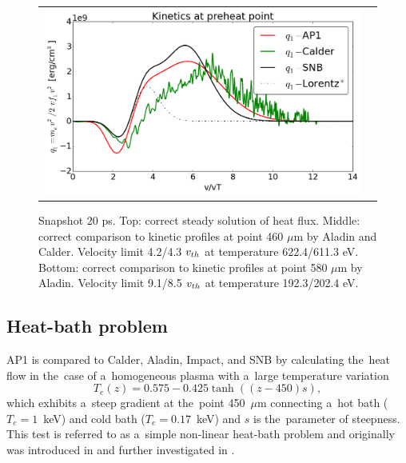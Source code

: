 \begin{figure}[htb]
\begin{center}
\begin{tabular}{cc}
      \includegraphics[width=\figscale\textwidth]{../VFPdata/C7_Calder_case5_nonlocal_kinetics.png}
	\end{tabular}
  \caption{  
  Snapshot 20 ps. Top: correct steady solution of heat flux. 
  Middle: correct comparison to kinetic profiles at point 460 $\mu$m 
  by Aladin and Calder. 
  Velocity limit 4.2/4.3 $v_{th}$ at temperature 622.4/611.3 eV.
  Bottom: correct comparison to kinetic profiles at point 580 $\mu$m by Aladin.
  Velocity limit 9.1/8.5 $v_{th}$ at temperature 192.3/202.4 eV.
  }
  \label{fig:C7_AladinCalder_case5}
  \end{center} 
\end{figure}

\subsection{Heat-bath problem}  
\label{sec:heatbath_test}

AP1 is compared to Calder, Aladin, Impact, and SNB by 
calculating the~heat flow in the~case of a~homogeneous plasma
with a~large temperature variation
\begin{equation}
  T_e(z) = 0.575 - 0.425 \tanh\left((z-450) s\right) ,
  \label{eq:T_init}
\end{equation}
which exhibits a~steep gradient at the~point 450~$\mu$m 
connecting a~hot bath ($T_e = 1$~keV) 
and cold bath ($T_e = 0.17$~keV) and $s$ is the~parameter of steepness. 
This test is referred to as a~simple non-linear heat-bath problem and
originally was introduced in \cite{marocchino2013} and further investigated
in  \cite{Sorbo_2015, Sorbo_2016, Sherlock_PoP2017, Brodrick_PoP2017}.

